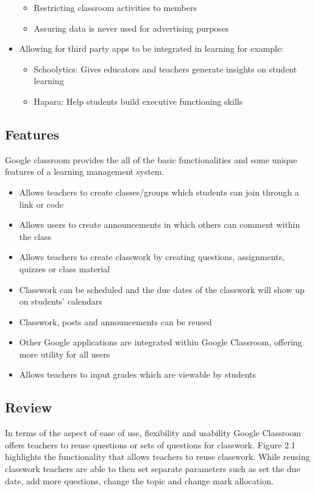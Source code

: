\begin{itemize}
\begin{itemize}
        \item Restricting classroom activities to members
        \item Assuring data is never used for advertising purposes 
    \end{itemize}
    \item Allowing for third party apps to be integrated in learning for example:
    \begin{itemize}
        \item Schoolytics: Gives educators and teachers generate insights on student learning 
        \item Hapara: Help students build executive functioning skills
    \end{itemize}
\end{itemize}

\subsection{Features}
Google classroom provides the all of the basic functionalities and some unique features of a learning management system.
\begin{itemize}
    \item Allows teachers to create classes/groups which students can join through a link or code 
    \item Allows users to create announcements in which others can comment within the class
    \item Allows teachers to create classwork by creating questions, assignments, quizzes or class material
    \item Classwork can be scheduled and the due dates of the classwork will show up on students’ calendars
    \item Classwork, posts and announcements can be reused
    \item Other Google applications are integrated within Google Classroom, offering more utility for all users
    \item Allows teachers to input grades which are viewable by students
\end{itemize}

\newpage

\subsection{Review}

In terms of the aspect of ease of use, flexibility and usability Google Classroom offers teachers to reuse questions or sets of questions for classwork.
Figure 2.1 highlights the functionality that allows teachers to reuse classwork. 
While reusing classwork teachers are able to then set separate parameters such as set the due date, add more questions, change the topic and change mark allocation.

